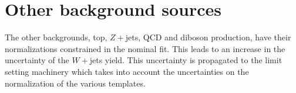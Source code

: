\section{Other background sources}
\label{sec:otherBackgrounds}

The other backgrounds, top, $Z+$jets, QCD and diboson production, have
their normalizations constrained in the nominal fit.  This leads to an increase in the 
uncertainty of the $W+$jets yield.  This uncertainty is propagated to the limit setting
machinery which takes into account the uncertainties on the normalization of the various
templates.
